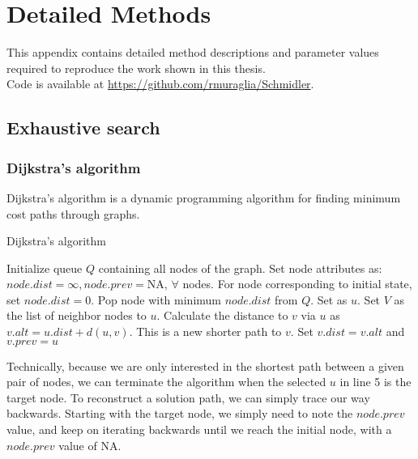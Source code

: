 

\chapter{Detailed Methods}

This appendix contains detailed method descriptions and parameter values required to reproduce the work shown in this thesis. \\
Code is available at \url{https://github.com/rmuraglia/Schmidler}.

\section{Exhaustive search} %
\label{sec:exhaustive_search}

\subsection{Dijkstra's algorithm} %
\label{sub:dijkstra_s_algorithm}

Dijkstra's algorithm is a dynamic programming algorithm for finding minimum cost paths through graphs.

\begin{algorithm}
\caption{Dijkstra's algorithm}
\begin{algorithmic}[1]
    \STATE Initialize queue $Q$ containing all nodes of the graph.
    \STATE Set node attributes as: $node.dist=\infty, node.prev=$NA, $\forall$ nodes.
    \STATE For node corresponding to initial state, set $node.dist=0$.
        \STATE Pop node with minimum $node.dist$ from $Q$. Set as $u$.
        \STATE Set $V$ as the list of neighbor nodes to $u$.
            \STATE Calculate the distance to $v$ via $u$ as $v.alt = u.dist + d(u,v)$.
            \STATE This is a new shorter path to $v$.
            \STATE Set $v.dist = v.alt$ and $v.prev = u$
            \ENDIF
        \ENDFOR
    \ENDWHILE
\end{algorithmic}
\end{algorithm}

Technically, because we are only interested in the shortest path between a given pair of nodes, we can terminate the algorithm when the selected $u$ in line 5 is the target node.
To reconstruct a solution path, we can simply trace our way backwards. 
Starting with the target node, we simply need to note the $node.prev$ value, and keep on iterating backwards until we reach the initial node, with a $node.prev$ value of NA.

